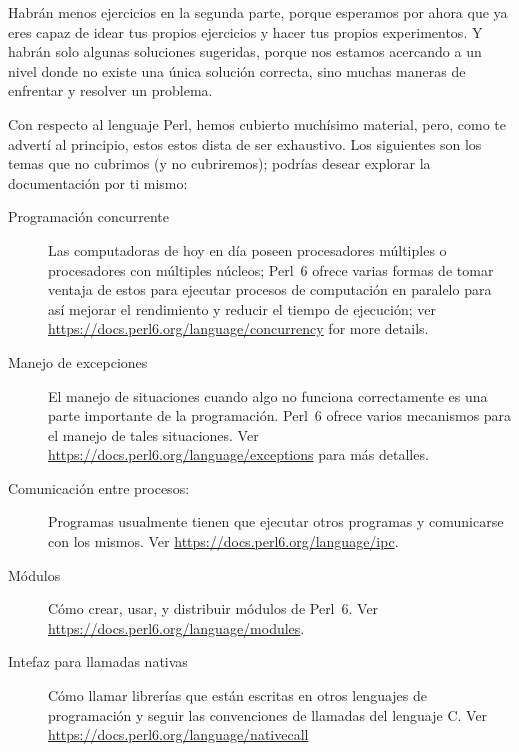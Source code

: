 Habrán menos ejercicios en la segunda parte, 
porque esperamos por ahora que ya eres capaz de idear 
tus propios ejercicios y hacer tus propios experimentos.
Y habrán solo algunas soluciones sugeridas, porque 
nos estamos acercando a un nivel donde no existe una 
única solución correcta, sino muchas maneras de 
enfrentar y resolver un problema.

Con respecto al lenguaje Perl, hemos cubierto muchísimo 
material, pero, como te advertí al principio, estos
estos dista de ser exhaustivo. Los siguientes son los temas
que no cubrimos (y no cubriremos); podrías desear explorar
la documentación por ti mismo:

\begin{description}
\item[Programación concurrente] Las computadoras de hoy en día
poseen procesadores múltiples o procesadores con múltiples
núcleos; Perl~6 ofrece varias formas de tomar ventaja de estos
para ejecutar procesos de computación en paralelo para así 
mejorar el rendimiento y reducir el tiempo de ejecución; ver
\url{https://docs.perl6.org/language/concurrency} 
for more details.

\item[Manejo de excepciones] El manejo de situaciones
cuando algo no funciona correctamente es una parte 
importante de la programación. Perl~6 ofrece varios
mecanismos para el manejo de tales situaciones.
Ver \url{https://docs.perl6.org/language/exceptions} 
para más detalles.

\item[Comunicación entre procesos:] Programas usualmente tienen
que ejecutar otros programas y comunicarse con los mismos. Ver 
\url{https://docs.perl6.org/language/ipc}.

\item[Módulos] Cómo crear, usar, y distribuir módulos de
Perl~6. Ver \url{https://docs.perl6.org/language/modules}.

\item[Intefaz para llamadas nativas] Cómo llamar librerías que están
escritas en otros lenguajes de programación y seguir las
convenciones de llamadas del lenguaje C.
Ver \url{https://docs.perl6.org/language/nativecall}

\end{description}